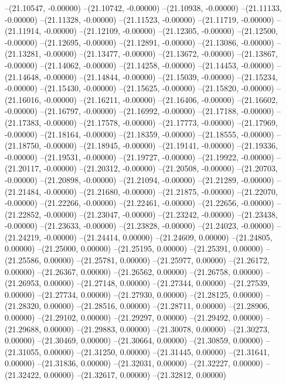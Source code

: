 --(21.10547, -0.00000)
--(21.10742, -0.00000)
--(21.10938, -0.00000)
--(21.11133, -0.00000)
--(21.11328, -0.00000)
--(21.11523, -0.00000)
--(21.11719, -0.00000)
--(21.11914, -0.00000)
--(21.12109, -0.00000)
--(21.12305, -0.00000)
--(21.12500, -0.00000)
--(21.12695, -0.00000)
--(21.12891, -0.00000)
--(21.13086, -0.00000)
--(21.13281, -0.00000)
--(21.13477, -0.00000)
--(21.13672, -0.00000)
--(21.13867, -0.00000)
--(21.14062, -0.00000)
--(21.14258, -0.00000)
--(21.14453, -0.00000)
--(21.14648, -0.00000)
--(21.14844, -0.00000)
--(21.15039, -0.00000)
--(21.15234, -0.00000)
--(21.15430, -0.00000)
--(21.15625, -0.00000)
--(21.15820, -0.00000)
--(21.16016, -0.00000)
--(21.16211, -0.00000)
--(21.16406, -0.00000)
--(21.16602, -0.00000)
--(21.16797, -0.00000)
--(21.16992, -0.00000)
--(21.17188, -0.00000)
--(21.17383, -0.00000)
--(21.17578, -0.00000)
--(21.17773, -0.00000)
--(21.17969, -0.00000)
--(21.18164, -0.00000)
--(21.18359, -0.00000)
--(21.18555, -0.00000)
--(21.18750, -0.00000)
--(21.18945, -0.00000)
--(21.19141, -0.00000)
--(21.19336, -0.00000)
--(21.19531, -0.00000)
--(21.19727, -0.00000)
--(21.19922, -0.00000)
--(21.20117, -0.00000)
--(21.20312, -0.00000)
--(21.20508, -0.00000)
--(21.20703, -0.00000)
--(21.20898, -0.00000)
--(21.21094, -0.00000)
--(21.21289, -0.00000)
--(21.21484, -0.00000)
--(21.21680, -0.00000)
--(21.21875, -0.00000)
--(21.22070, -0.00000)
--(21.22266, -0.00000)
--(21.22461, -0.00000)
--(21.22656, -0.00000)
--(21.22852, -0.00000)
--(21.23047, -0.00000)
--(21.23242, -0.00000)
--(21.23438, -0.00000)
--(21.23633, -0.00000)
--(21.23828, -0.00000)
--(21.24023, -0.00000)
--(21.24219, -0.00000)
--(21.24414, 0.00000)
--(21.24609, 0.00000)
--(21.24805, 0.00000)
--(21.25000, 0.00000)
--(21.25195, 0.00000)
--(21.25391, 0.00000)
--(21.25586, 0.00000)
--(21.25781, 0.00000)
--(21.25977, 0.00000)
--(21.26172, 0.00000)
--(21.26367, 0.00000)
--(21.26562, 0.00000)
--(21.26758, 0.00000)
--(21.26953, 0.00000)
--(21.27148, 0.00000)
--(21.27344, 0.00000)
--(21.27539, 0.00000)
--(21.27734, 0.00000)
--(21.27930, 0.00000)
--(21.28125, 0.00000)
--(21.28320, 0.00000)
--(21.28516, 0.00000)
--(21.28711, 0.00000)
--(21.28906, 0.00000)
--(21.29102, 0.00000)
--(21.29297, 0.00000)
--(21.29492, 0.00000)
--(21.29688, 0.00000)
--(21.29883, 0.00000)
--(21.30078, 0.00000)
--(21.30273, 0.00000)
--(21.30469, 0.00000)
--(21.30664, 0.00000)
--(21.30859, 0.00000)
--(21.31055, 0.00000)
--(21.31250, 0.00000)
--(21.31445, 0.00000)
--(21.31641, 0.00000)
--(21.31836, 0.00000)
--(21.32031, 0.00000)
--(21.32227, 0.00000)
--(21.32422, 0.00000)
--(21.32617, 0.00000)
--(21.32812, 0.00000)
